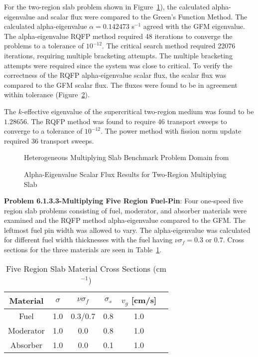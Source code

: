 For the two-region slab problem shown in Figure~\ref{fig:HeteroSlabMult}), the calculated alpha-eigenvalue and scalar flux were compared to the Green's Function Method. The calculated alpha-eigenvalue $\alpha = 0.142473$ s$^{-1}$ agreed with the GFM eigenvalue. The alpha-eigenvalue RQFP method required 48 iterations to converge the problems to a tolerance of $10^{-12}$. The critical search method required 22076 iterations, requiring multiple bracketing attempts. The multiple bracketing attempts were required since the system was close to critical. To verify the correctness of the RQFP alpha-eigenvalue scalar flux, the scalar flux was compared to the GFM scalar flux. The fluxes were found to be in agreement within tolerance (Figure~\ref{fig:TwoRegionMultiply}).

The $k$-effective eigenvalue of the supercritical two-region medium was found to be $1.28656$. The RQFP method was found to require 46 transport sweeps to converge to a tolerance of $10^{-12}$. The power method with fission norm update required 36 transport sweeps.

\begin{figure}[!htbp]
	\centering
	
	\caption{Heterogeneous Multiplying Slab Benchmark Problem Domain from \cite{kornreich_greens_1997}}
	\label{fig:HeteroSlabMult}
\end{figure}

\begin{figure}[!htbp]
	\centering
	\resizebox{0.75\textwidth}{!}{
	
	}
	\caption{Alpha-Eigenvalue Scalar Flux Results for Two-Region Multiplying Slab}
	\label{fig:TwoRegionMultiply}
\end{figure}

\clearpage
\textbf{Problem 6.1.3.3-Multiplying Five Region Fuel-Pin}: Four one-speed five region slab problems consisting of fuel, moderator, and absorber materials were examined and the RQFP method alpha-eigenvalue compared to the GFM. The leftmost fuel pin width was allowed to vary. The alpha-eigenvalue was calculated for different fuel width thicknesses with the fuel having $\nu \sigma_{f} = 0.3$ or $0.7$. Cross sections for the three materials are seen in Table~\ref{table:BetzlerFive}.

\begin{table}[H]
    \centering
    \caption{Five Region Slab Material Cross Sections (cm$^{-1}$)}
\label{table:BetzlerFive}
    \begin{tabular}{*6c}
        \toprule
	Material & $\sigma$ & $\nu \sigma_{f}$ & $\sigma_{s}$ & $v_{g}$ [cm/s] \\ 
        \midrule
	Fuel & 1.0 & 0.3/0.7 & 0.8 & 1.0 \\
	Moderator & 1.0 & 0.0 & 0.8 & 1.0 \\ 
	Absorber & 1.0 & 0.0 & 0.1 & 1.0 \\ 
        \bottomrule
    \end{tabular}
\end{table}

